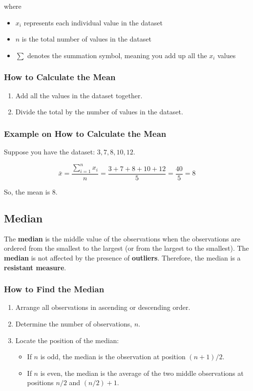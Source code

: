 where
\begin{itemize}
    \item \( x_i \) represents each individual value in the dataset
    \item \( n \) is the total number of values in the dataset
    \item \( \sum \) denotes the summation symbol, meaning you add up all the \( x_i \) values
\end{itemize}

\subsubsection*{How to Calculate the Mean}
\begin{enumerate}
    \item Add all the values in the dataset together.
    \item Divide the total by the number of values in the dataset.
\end{enumerate}

\subsubsection*{Example on How to Calculate the Mean}
Suppose you have the dataset: \( 3, 7, 8, 10, 12 \).

\[
\bar{x} = \frac{\sum_{i=1}^n x_i}{n} = \frac{3 + 7 + 8 + 10 + 12}{5} = \frac{40}{5} = 8
\]

So, the mean is \( 8 \).

\subsection{Median}
The \textbf{median} is the middle value of the observations when the observations are ordered from the smallest to the largest (or from the largest to the smallest). The \textbf{median} is not affected by the presence of \textbf{outliers}. Therefore, the median is a \textbf{resistant measure}.

\subsubsection*{How to Find the Median}
\begin{enumerate}
    \item Arrange all observations in ascending or descending order.
    \item Determine the number of observations, \(n\).
    \item Locate the position of the median:
    \begin{itemize}
        \item If \(n\) is odd, the median is the observation at position \((n+1)/2\).
        \item If \(n\) is even, the median is the average of the two middle observations at positions \(n/2\) and \((n/2) + 1\).
    \end{itemize}
\end{enumerate}

